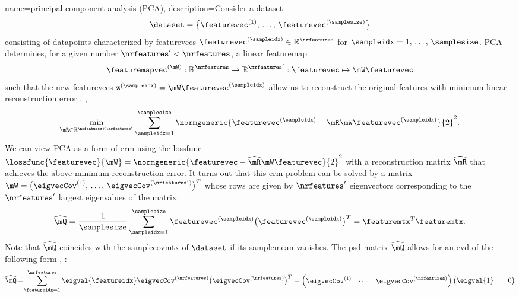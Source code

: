 {name={principal component analysis (PCA)}, 
	description={Consider a \gls{dataset} 
		$$\dataset = \big\{ \featurevec^{(1)}, \,\ldots, \,\featurevec^{(\samplesize)} \big\}$$
		consisting of \glspl{datapoint} characterized by \glspl{featurevec} 
		$\featurevec^{(\sampleidx)} \in \mathbb{R}^{\nrfeatures}$ for $\sampleidx=1,\,\ldots,\,\samplesize$.
		PCA determines, for a given number 
		$\nrfeatures' < \nrfeatures$, a linear \gls{featuremap} 
		$$\featuremapvec^{(\mW)}: \mathbb{R}^{\nrfeatures} \rightarrow 
		\mathbb{R}^{\nrfeatures'}: \featurevec \mapsto \mW \featurevec$$ 
		such that the new \glspl{featurevec} 
		$\mathbf{z}^{(\sampleidx)} = \mW \featurevec^{(\sampleidx)}$ 
		allow us to reconstruct the original \glspl{feature} with  
		\gls{minimum} linear reconstruction error \cite{MLBasics}, \cite{BishopBook}, \cite{hastie01statisticallearning}:
		$$\min_{\mR \in \mathbb{R}^{\nrfeatures \times \nrfeatures'}} 
		\sum_{\sampleidx=1}^{\samplesize} 
		\normgeneric{\featurevec^{(\sampleidx)}- \mR \mW \featurevec^{(\sampleidx)}}{2}^{2}.$$ 
		We can view PCA as a form of \gls{erm} using the \gls{lossfunc} 
		$\lossfunc{\featurevec}{\mW} = \normgeneric{\featurevec- \widehat{\mR} \mW \featurevec}{2}^{2}$ with a 
		reconstruction \gls{matrix} $\widehat{\mR}$ 
		that achieves the above \gls{minimum} reconstruction error. It turns 
		out that this \gls{erm} problem can be solved by a \gls{matrix}  
		$\mW = \big(\eigvecCov^{(1)},\,\ldots,\,\eigvecCov^{(\nrfeatures')}\big)^{T}$ 
		whose rows are given by $\nrfeatures'$ 
		\glspl{eigenvector} corresponding to the $\nrfeatures'$ largest 
		\glspl{eigenvalue} of the \gls{matrix}:
		$$\widehat{\mQ} = \frac{1}{\samplesize} \sum_{\sampleidx=1}^{\samplesize} 
		\featurevec^{(\sampleidx)} \big( \featurevec^{(\sampleidx)}\big)^{T}
		=\featuremtx^{T} \featuremtx.$$ 
		Note that $\widehat{\mQ}$ coincides with the \gls{samplecovmtx} of 
		$\dataset$ if its \gls{samplemean} vanishes. The \gls{psd} \gls{matrix} 
		$\widehat{\mQ}$ allows for an \gls{evd} of the following form
		\cite{HornMatAnalysis}, \cite{MeyerMatrixAnalysis}:
		$$\widehat{\mQ}\!=\!\sum_{\featureidx=1}^{\nrfeatures} \eigval{\featureidx} 
			\eigvecCov^{(\nrfeatures)} \big( \eigvecCov^{(\nrfeatures)} \big)^{T}=
			\begin{pmatrix}
			\eigvecCov^{(1)} & \cdots & \eigvecCov^{(\nrfeatures)}
			\end{pmatrix}
			\begin{pmatrix}
			\eigval{1}        &        & 0 \\

\end{pmatrix}$$}}
